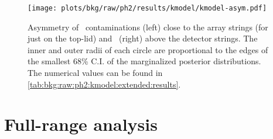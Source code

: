 \begin{figure}
  \centering
  \texttt{[image: plots/bkg/raw/ph2/results/kmodel/kmodel-asym.pdf]}
  \caption{%
    Asymmetry of \kvn\ contaminations (left) close to the array strings (for  just
    on the top-lid) and \kvz\ (right) above the detector strings. The inner and outer
    radii of each circle are proportional to the edges of the smallest 68\% C.I. of the
    marginalized posterior distributions. The numerical values can be found in
    \cref{tab:bkg:raw:ph2:kmodel:extended:results}.
  }\label{fig:bkg:raw:ph2:kmodel:extended:strings}
\end{figure}

\section{Full-range analysis}%
\label{sec:bkg:raw:ph2:gmodel}

